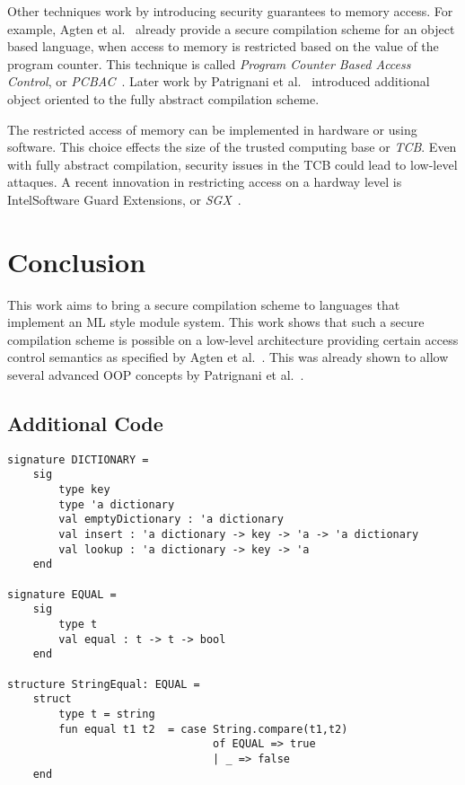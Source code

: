 \documentclass[11pt]{article}
\newcommand{\mypageref}[1]{Page~\pageref{#1}}
\newcommand{\earlier}[2]{{\protect\myref{#1}{#2}} on {\protect\mypageref{#2}}}
\begin{document}
Other techniques work by introducing security guarantees to memory access.
For example, Agten et al.~\cite{Agten:2012:SCM:2354412.2355247} already provide a secure compilation scheme for an object based language, when access to memory is restricted based on the value of the program counter. This technique is called \emph{Program Counter Based Access Control}, or \emph{PCBAC}~\cite{PCBAC}.
Later work by Patrignani et al.~\cite{Patrignani} introduced additional object oriented to the fully abstract compilation scheme.

The restricted access of memory can be implemented in hardware\cite{Sancus,SGX} or using software\cite{Fides,Salus}.
This choice effects the size of the trusted computing base or \emph{TCB}.
Even with fully abstract compilation, security issues in the TCB could lead to low-level attaques.
A recent innovation in restricting access on a hardway level is Intel\textregistered Software Guard Extensions, or \emph{SGX}~\cite{SGX}.

\section{Conclusion}
This work aims to bring a secure compilation scheme to languages that implement an ML style module system.
This work shows that such a secure compilation scheme is possible on a low-level architecture providing certain access control semantics as specified by Agten et al.~\cite{Agten:2012:SCM:2354412.2355247}. 
This was already shown to allow several advanced OOP concepts by Patrignani et al.~\cite{Patrignani}.

\clearpage
\begin{appendices}
\section{Additional Code}
\label{app:AdditionalCode}
\begin{lstlisting}[label={lst:AdditionalSignatures}, caption={The auxilary signatures and structures for the functor example of \earlier{lst}{lst:DictionaryFunctorExample}.}]
signature DICTIONARY =
    sig
        type key
        type 'a dictionary
        val emptyDictionary : 'a dictionary
        val insert : 'a dictionary -> key -> 'a -> 'a dictionary
        val lookup : 'a dictionary -> key -> 'a
    end

signature EQUAL =
    sig
        type t
        val equal : t -> t -> bool
    end

structure StringEqual: EQUAL = 
    struct
        type t = string
        fun equal t1 t2  = case String.compare(t1,t2)
                                of EQUAL => true
                                | _ => false
    end
\end{lstlisting}
\end{appendices}


\end{document}
